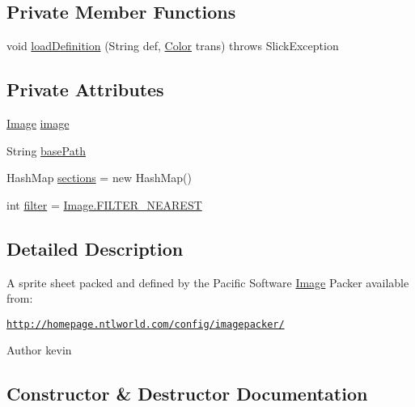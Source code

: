\subsection*{Private Member Functions}
\begin{DoxyCompactItemize}
\item 
void \mbox{\hyperlink{classorg_1_1newdawn_1_1slick_1_1_packed_sprite_sheet_a35e3dcf7f2143738d56291dca1ed620e}{load\+Definition}} (String def, \mbox{\hyperlink{classorg_1_1newdawn_1_1slick_1_1_color}{Color}} trans)  throws Slick\+Exception 
\end{DoxyCompactItemize}
\subsection*{Private Attributes}
\begin{DoxyCompactItemize}
\item 
\mbox{\hyperlink{classorg_1_1newdawn_1_1slick_1_1_image}{Image}} \mbox{\hyperlink{classorg_1_1newdawn_1_1slick_1_1_packed_sprite_sheet_a3bfe1d01086f84a9f9bdacbfb2f5ceba}{image}}
\item 
String \mbox{\hyperlink{classorg_1_1newdawn_1_1slick_1_1_packed_sprite_sheet_a5343b639d543ab4780adabb0f8ac15cd}{base\+Path}}
\item 
Hash\+Map \mbox{\hyperlink{classorg_1_1newdawn_1_1slick_1_1_packed_sprite_sheet_a7585e251934ce67d5c2a69448e461f29}{sections}} = new Hash\+Map()
\item 
int \mbox{\hyperlink{classorg_1_1newdawn_1_1slick_1_1_packed_sprite_sheet_a03daeb71e62c853200c961868ce8468a}{filter}} = \mbox{\hyperlink{classorg_1_1newdawn_1_1slick_1_1_image_ada43983f8d07a25e8f647ce2993dfff7}{Image.\+F\+I\+L\+T\+E\+R\+\_\+\+N\+E\+A\+R\+E\+ST}}
\end{DoxyCompactItemize}


\subsection{Detailed Description}
A sprite sheet packed and defined by the Pacific Software \mbox{\hyperlink{classorg_1_1newdawn_1_1slick_1_1_image}{Image}} Packer available from\+:

\href{http://homepage.ntlworld.com/config/imagepacker/}{\tt http\+://homepage.\+ntlworld.\+com/config/imagepacker/}

\begin{DoxyAuthor}{Author}
kevin 
\end{DoxyAuthor}


\subsection{Constructor \& Destructor Documentation}
\mbox{\label{classorg_1_1newdawn_1_1slick_1_1_packed_sprite_sheet_acf930c67e88ddf2cccb7d0da3f8a2801}} 
